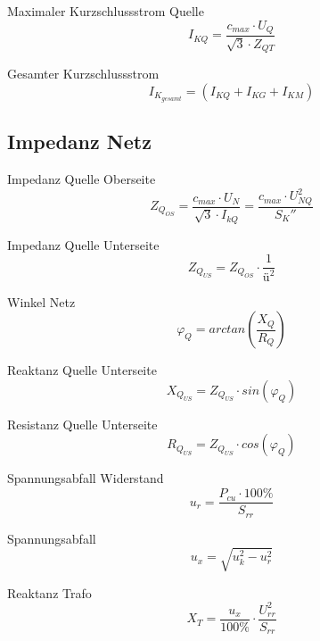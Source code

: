\documentclass[11pt, a4paper, draft, fleqn, twocolumn]{article}
\numberwithin{equation}{subsection}
\begin{document}
\noindent Maximaler Kurzschlussstrom Quelle
\begin{equation}
    I_{KQ} = \frac{c_{max} \cdot U_Q}{\sqrt{3} \cdot Z_{QT}}
\end{equation}

\noindent Gesamter Kurzschlussstrom
\begin{equation}
    I_{K_{gesamt}} = (I_{KQ} + I_{KG} + I_{KM})
\end{equation}


\subsection{Impedanz Netz}

Impedanz Quelle Oberseite
\begin{equation}
    Z_{Q_{OS}} = \frac{c_{max} \cdot U_N}{\sqrt{3} \cdot I_{kQ}} = \frac{c_{max} \cdot U_{NQ}^2}{S_K''}
\end{equation}

\noindent Impedanz Quelle Unterseite
\begin{equation}
    Z_{Q_{US}} = Z_{Q_{OS}} \cdot \frac{1}{\text{ü}^2}
\end{equation}

\noindent Winkel Netz
\begin{equation}
    \varphi_Q = arctan(\frac{X_Q}{R_Q})
\end{equation}

\noindent Reaktanz Quelle Unterseite
\begin{equation}
    X_{Q_{US}} = Z_{Q_{US}} \cdot sin(\varphi_Q)
\end{equation}

\noindent Resistanz Quelle Unterseite
\begin{equation}
    R_{Q_{US}} = Z_{Q_{US}} \cdot cos(\varphi_Q)
\end{equation}

\noindent Spannungsabfall Widerstand
\begin{equation}
    u_r = \frac{P_{cu} \cdot 100\%}{S_{rr}}
\end{equation}

\noindent Spannungsabfall
\begin{equation}
    u_x = \sqrt{u_k^2 - u_r^2}
\end{equation}

\noindent Reaktanz Trafo
\begin{equation}
    X_T = \frac{u_x}{100\%} \cdot \frac{U_{rr}^2}{S_{rr}}
\end{equation}
\end{document}

